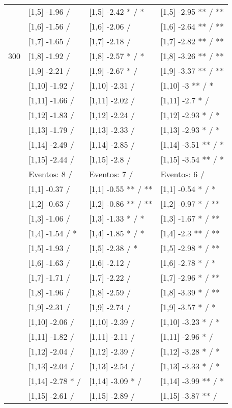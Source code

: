 \begin{table}
\begin{tabular}[t]{llll}
 & {}[1,5] -1.96  / & {}[1,5] -2.42 * / * & {}[1,5] -2.95 ** / **\\
 & {}[1,6] -1.56  / & {}[1,6] -2.06  / & {}[1,6] -2.64 ** / **\\
 & {}[1,7] -1.65  / & {}[1,7] -2.18  / & {}[1,7] -2.82 ** / **\\
300 & {}[1,8] -1.92  / & {}[1,8] -2.57 * / * & {}[1,8] -3.26 ** / **\\
\addlinespace
 & {}[1,9] -2.21  / & {}[1,9] -2.67 * / & {}[1,9] -3.37 ** / **\\
 & {}[1,10] -1.92  / & {}[1,10] -2.31  / & {}[1,10] -3 ** / *\\
 & {}[1,11] -1.66  / & {}[1,11] -2.02  / & {}[1,11] -2.7 * /\\
 & {}[1,12] -1.83  / & {}[1,12] -2.24  / & {}[1,12] -2.93 * / *\\
 & {}[1,13] -1.79  / & {}[1,13] -2.33  / & {}[1,13] -2.93 * / *\\
\addlinespace
 & {}[1,14] -2.49  / & {}[1,14] -2.85  / & {}[1,14] -3.51 ** / *\\
 & {}[1,15] -2.44  / & {}[1,15] -2.8  / & {}[1,15] -3.54 ** / *\\
 & Eventos:  8 / & Eventos:  7 / & Eventos:  6 /\\
 & {}[1,1] -0.37  / & {}[1,1] -0.55 ** / ** & {}[1,1] -0.54 * / *\\
 & {}[1,2] -0.63  / & {}[1,2] -0.86 ** / ** & {}[1,2] -0.97 * / **\\
\addlinespace
 & {}[1,3] -1.06  / & {}[1,3] -1.33 * / * & {}[1,3] -1.67 * / **\\
 & {}[1,4] -1.54  / * & {}[1,4] -1.85 * / * & {}[1,4] -2.3 ** / **\\
 & {}[1,5] -1.93  / & {}[1,5] -2.38  / * & {}[1,5] -2.98 * / **\\
 & {}[1,6] -1.63  / & {}[1,6] -2.12  / & {}[1,6] -2.78 * / *\\
 & {}[1,7] -1.71  / & {}[1,7] -2.22  / & {}[1,7] -2.96 * / **\\
\addlinespace
500 & {}[1,8] -1.96  / & {}[1,8] -2.59  / & {}[1,8] -3.39 * / **\\
 & {}[1,9] -2.31  / & {}[1,9] -2.74  / & {}[1,9] -3.57 * / *\\
 & {}[1,10] -2.06  / & {}[1,10] -2.39  / & {}[1,10] -3.23 * / *\\
 & {}[1,11] -1.82  / & {}[1,11] -2.11  / & {}[1,11] -2.96 * /\\
 & {}[1,12] -2.04  / & {}[1,12] -2.39  / & {}[1,12] -3.28 * / *\\
\addlinespace
 & {}[1,13] -2.04  / & {}[1,13] -2.54  / & {}[1,13] -3.33 * / *\\
 & {}[1,14] -2.78 * / & {}[1,14] -3.09 * / & {}[1,14] -3.99 ** / *\\
 & {}[1,15] -2.61  / & {}[1,15] -2.89  / & {}[1,15] -3.87 ** /\\
\bottomrule
\end{tabular}
\end{table}
